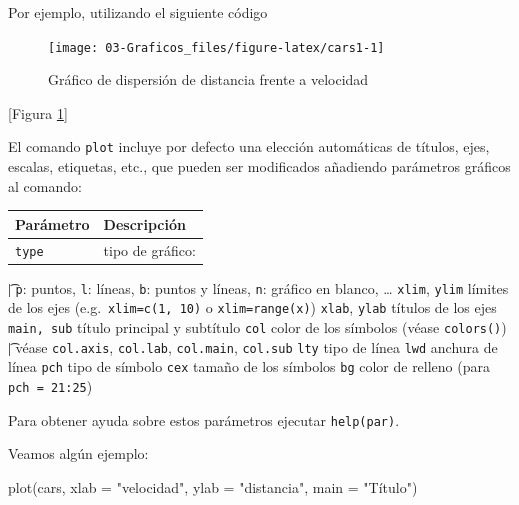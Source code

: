 \documentclass[
]{book}
\newenvironment{Shaded}{\begin{snugshade}}{\end{snugshade}}
\newcommand{\AttributeTok}[1]{\textcolor[rgb]{0.77,0.63,0.00}{#1}}
\newcommand{\CommentTok}[1]{\textcolor[rgb]{0.56,0.35,0.01}{\textit{#1}}}
\newcommand{\FunctionTok}[1]{\textcolor[rgb]{0.00,0.00,0.00}{#1}}
\newcommand{\NormalTok}[1]{#1}
\newcommand{\SpecialCharTok}[1]{\textcolor[rgb]{0.00,0.00,0.00}{#1}}
\newcommand{\StringTok}[1]{\textcolor[rgb]{0.31,0.60,0.02}{#1}}
\theoremstyle{break}
\theoremstyle{nonumberplain}
\begin{document}
Por ejemplo, utilizando el siguiente código

\begin{Shaded}
\end{Shaded}

\begin{figure}[!htb]

{\centering \texttt{[image: 03-Graficos\_files/figure-latex/cars1-1]} 

}

\caption{Gráfico de dispersión de distancia frente a velocidad}\label{fig:cars1}
\end{figure}

{[}Figura \ref{fig:cars1}{]}

El comando \texttt{plot} incluye por defecto una elección automáticas de
títulos, ejes, escalas, etiquetas, etc., que pueden ser modificados
añadiendo parámetros gráficos al comando:

\begin{longtable}[]{@{}ll@{}}
\toprule
Parámetro & Descripción \\
\midrule
\endhead
\texttt{type} & tipo de gráfico: \\
\bottomrule
\end{longtable}

\t      | \texttt{p}: puntos, \texttt{l}: líneas, \texttt{b}: puntos y líneas, \texttt{n}: gráfico en blanco, \ldots{}
\texttt{xlim}, \texttt{ylim} \textbar{} límites de los ejes (e.g.~\texttt{xlim=c(1,\ 10)} o \texttt{xlim=range(x)})
\texttt{xlab}, \texttt{ylab} \textbar{} títulos de los ejes
\texttt{main,\ sub} \textbar{} título principal y subtítulo
\texttt{col} \textbar{} color de los símbolos (véase \texttt{colors()})
\t     | véase \texttt{col.axis}, \texttt{col.lab}, \texttt{col.main}, \texttt{col.sub}
\texttt{lty} \textbar{} tipo de línea
\texttt{lwd} \textbar{} anchura de línea
\texttt{pch} \textbar{} tipo de símbolo
\texttt{cex} \textbar{} tamaño de los símbolos
\texttt{bg} \textbar{} color de relleno (para \texttt{pch\ =\ 21:25})

Para obtener ayuda sobre estos parámetros ejecutar \texttt{help(par)}.

Veamos algún ejemplo:

\begin{Shaded}
\begin{Highlighting}[]
\FunctionTok{plot}\NormalTok{(cars, }\AttributeTok{xlab =} \StringTok{"velocidad"}\NormalTok{, }\AttributeTok{ylab =} \StringTok{"distancia"}\NormalTok{, }\AttributeTok{main =} \StringTok{"Título"}\NormalTok{)}
\end{Highlighting}
\end{Shaded}
\end{document}
